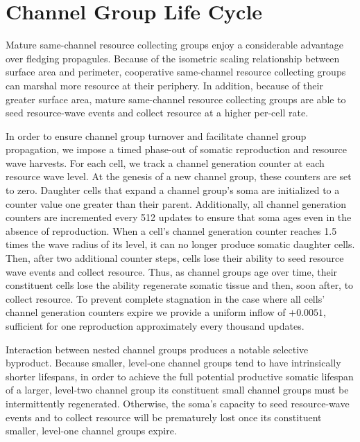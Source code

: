 \section{Channel Group Life Cycle} \label{sec:channel_group_life_cycle}

Mature same-channel resource collecting groups enjoy a considerable advantage over fledging propagules.
Because of the isometric scaling relationship between surface area and perimeter, cooperative same-channel resource collecting groups can marshal more resource at their periphery.
In addition, because of their greater surface area, mature same-channel resource collecting groups are able to seed resource-wave events and collect resource at a higher per-cell rate.

In order to ensure channel group turnover and facilitate channel group propagation, we impose a timed phase-out of somatic reproduction and resource wave harvests.
For each cell, we track a channel generation counter at each resource wave level.
At the genesis of a new channel group, these counters are set to zero.
Daughter cells that expand a channel group's soma are initialized to a counter value one greater than their parent.
Additionally, all channel generation counters are incremented every 512 updates to ensure that soma ages even in the absence of reproduction.
When a cell's channel generation counter reaches 1.5 times the wave radius of its level, it can no longer produce somatic daughter cells.
Then, after two additional counter steps, cells lose their ability to seed resource wave events and collect resource.
Thus, as channel groups age over time, their constituent cells lose the ability regenerate somatic tissue and then, soon after, to collect resource.
To prevent complete stagnation in the case where all cells' channel generation counters expire we provide a uniform inflow of $+0.0051$, sufficient for one reproduction approximately every thousand updates.

Interaction between nested channel groups produces a notable selective byproduct.
Because smaller, level-one channel groups tend to have intrinsically shorter lifespans, in order to achieve the full potential productive somatic lifespan of a larger, level-two channel group its constituent small channel groups must be intermittently regenerated.
Otherwise, the soma's capacity to seed resource-wave events and to collect resource will be prematurely lost once its constituent smaller, level-one channel groups expire.

